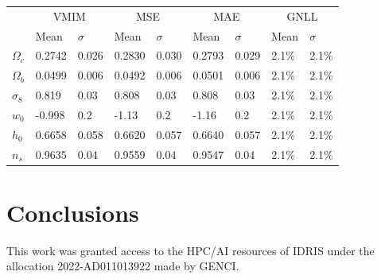 \documentclass{aa}
\begin{document}
\begin{table}
  \begin{tabular}{|l|l|l|l|l|l|l|l|l|}
    \hline
    \multirow{2}{*}{} &
      \multicolumn{2}{c|}{VMIM} &
      \multicolumn{2}{c|}{MSE} &
      \multicolumn{2}{c|}{MAE} &
      \multicolumn{2}{c|}{GNLL} \\
    & Mean & $\sigma$ & Mean & $\sigma$ & Mean & $\sigma$  & Mean & $\sigma$ \\
    \hline
    \hline
    $\Omega_c$ & 0.2742 & 0.026 & 0.2830 & 0.030 & 0.2793 & 0.029  & 2.1\% & 2.1\%\\
    \hline
    $\Omega_b$ & 0.0499 & 0.006 & 0.0492 & 0.006 &  0.0501 & 0.006 & 2.1\% & 2.1\% \\
    \hline
    $\sigma_8$ & 0.819 & 0.03 &0.808 & 0.03 &  0.808 &0.03 & 2.1\% & 2.1\% \\
    \hline
    $w_0$      &-0.998 & 0.2 &-1.13 & 0.2 & -1.16& 0.2  & 2.1\% & 2.1\% \\
    \hline
    $h_0$      & 0.6658 & 0.058 &0.6620 & 0.057 & 0.6640 & 0.057&  2.1\% & 2.1\% \\
    \hline
    $n_s$      & 0.9635 & 0.04 & 0.9559 & 0.04 & 0.9547 & 0.04  & 2.1\% & 2.1\% \\
    \hline
  \end{tabular}
\end{table}
\section{Conclusions}\label{Sec:conclusion}
\begin{acknowledgements}
This work was granted access to the HPC/AI resources of IDRIS under the allocation 2022-AD011013922 made by GENCI.
\end{acknowledgements}
 
\end{document}
